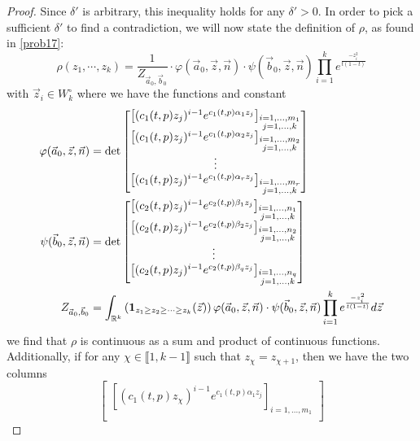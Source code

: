 \begin{proof}
	Since $\delta'$ is arbitrary, this inequality holds for any $\delta'>0$. 
	In order to pick a sufficient $\delta'$ to find a contradiction, we will now state the definition of $\rho$, as found in \ref{prob17}: 
	\[\rho(z_1,\cdots ,z_k)=\frac{1}{Z_{\vec a_0, \vec b_0}}\cdot \varphi(\vec a_0, \vec z, \vec n)\cdot \psi(\vec b_0, \vec z, \vec n)\prod_{i=1}^{k}e^{\frac{-z_i^2}{t(1-t)}}
	\]
	with $\vec z_i\in W_k^\circ$ where we have the functions and constant
	\begin{align*}
	\varphi(\vec a_0,\vec z, \vec n)&=\det\begin{bmatrix}
	\left[(c_1(t,p)z_j)^{i-1}e^{c_1(t,p)\alpha_1 z_j}\right]_{\substack{i=1,...,m_1\\j=1,...,k}}\\
	\left[(c_1(t,p)z_j)^{i-1}e^{c_1(t,p)\alpha_2 z_j}\right]_{\substack{i=1,...,m_2\\j=1,...,k}}\\
	\vdots \\
	\left[(c_1(t,p)z_j)^{i-1}e^{c_1(t,p)\alpha_r z_j}\right]_{\substack{i=1,...,m_r\\j=1,...,k}}
	\end{bmatrix}\\
	\psi(\vec b_0, \vec z, \vec n)&=\det\begin{bmatrix}
	\left[(c_2(t,p)z_j)^{i-1}e^{c_2(t,p)\beta_1 z_j}\right]_{\substack{i=1,...,n_1\\j=1,...,k}}\\
	\left[(c_2(t,p)z_j)^{i-1}e^{c_2(t,p)\beta_2 z_j}\right]_{\substack{i=1,...,n_2\\j=1,...,k}}\\
	\vdots \\
	\left[(c_2(t,p)z_j)^{i-1}e^{c_2(t,p)\beta_q z_j}\right]_{\substack{i=1,...,n_q\\j=1,...,k}}
	\end{bmatrix}\\
	Z_{\vec a_0, \vec b_0}&=\int_{\mathbb{R}^k}\left(\operatorname{\mathbf{1}}_{z_1\geq z_2\geq \cdots \geq z_k}(\vec z)\right)\varphi(\vec a_0, \vec z, \vec n)\cdot \psi(\vec b_0, \vec z, \vec n)\prod_{i=1}^{k}e^{\frac{-z_i^2}{t(1-t)}} d\vec z
	\end{align*} we find that $\rho$ is continuous as a sum and product of continuous functions. Additionally, if for any $\chi\in\llbracket 1,k-1 \rrbracket$ such that $z_\chi=z_{\chi+1}$, then we have the two columns 
	\[\begin{bmatrix}
	\left[(c_1(t,p)z_\chi)^{i-1}e^{c_1(t,p)\alpha_1 z_j}\right]_{i=1,...,m_1}\\

\end{bmatrix}\]
\end{proof}

